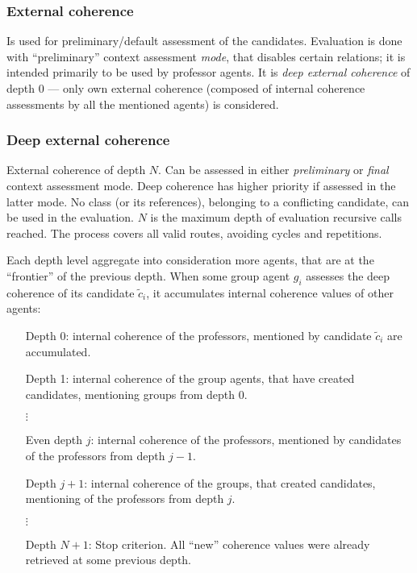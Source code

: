 \documentclass[../../header]{subfiles}
\begin{document}

\subsubsection{External coherence}
Is used for preliminary/default assessment of the candidates.
Evaluation is done with ``preliminary'' context assessment \emph{mode}, that
disables certain relations; it is intended primarily to be used by professor agents.
It is \emph{deep external coherence} of depth 0 --- only own external coherence
(composed of internal coherence assessments by all the mentioned agents) is
considered.



\subsubsection{Deep external coherence}
External coherence of depth $N$. Can be assessed in either \emph{preliminary}
or \emph{final} context assessment mode. Deep coherence has higher priority if
assessed in the latter mode.
No class (or its references), belonging to a conflicting candidate, can be used in
the evaluation.
$N$ is the maximum depth of evaluation recursive calls reached.
The process covers all valid routes, avoiding cycles and repetitions.

Each depth level aggregate into consideration more agents, that are at the
``frontier'' of the previous depth. When some group agent $g_i$ assesses the
deep coherence of its candidate $\tilde{c}_i$, it accumulates internal
coherence values of other agents:
\begin{itemize}[leftmargin=2.5cm]
  \item[Depth 0:] internal coherence of the professors,
            mentioned by candidate $\tilde{c}_i$ are accumulated.
  \item[Depth 1:] internal coherence of the group agents,
            that have created candidates, mentioning groups from depth 0.
  \item[$\vdots$]
  \item[Even depth $j$:] internal coherence of the professors,
            mentioned by candidates of the professors from depth $j-1$.
  \item[Depth $j+1$:] internal coherence of the groups,
            that created candidates, mentioning of the professors from depth $j$.
  \item[$\vdots$]
  \item[Depth $N+1$:] Stop criterion.
            All ``new'' coherence values were already retrieved at some previous depth.
\end{itemize}
\end{document}
